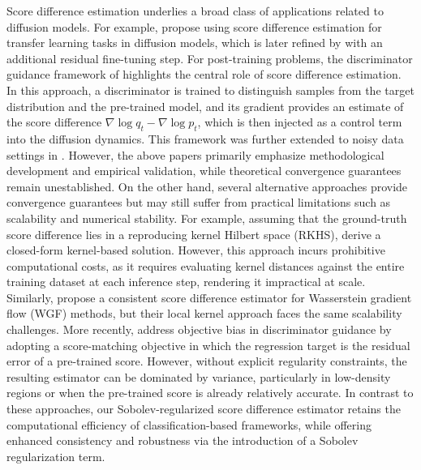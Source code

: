 \documentclass[11pt]{article}
\theoremstyle{plain}
\theoremstyle{definition}
\theoremstyle{remark}
\begin{document}
Score difference estimation underlies a broad class of applications related to diffusion models. For example, \cite{ouyang2024transfer} propose using score difference estimation for transfer learning tasks in diffusion models, which is later refined by \cite{wang2024bridging} with an additional residual fine-tuning step. For post-training problems, the discriminator guidance framework of \cite{kim2022refining} highlights the central role of score difference estimation. In this approach, a discriminator is trained to distinguish samples from the target distribution and the pre-trained model, and its gradient provides an estimate of the score difference $\nabla \log q_t - \nabla \log p_t$, which is then injected as a control term into the diffusion dynamics. This framework was further extended to noisy data settings in \cite{cong2025guiding}. However, the above papers primarily emphasize methodological development and empirical validation, while theoretical convergence guarantees remain unestablished. On the other hand, several alternative approaches provide convergence guarantees but may still suffer from practical limitations such as scalability and numerical stability.
For example, assuming that the ground-truth score difference lies in a reproducing kernel Hilbert space (RKHS), \cite{srikanthaccelerated} derive a closed-form kernel-based solution. However, this approach incurs prohibitive computational costs, as it requires evaluating kernel distances against the entire training dataset at each inference step, rendering it impractical at scale. Similarly, \cite{liu2023minimizing} propose a consistent score difference estimator for Wasserstein gradient flow (WGF) methods, but their local kernel approach faces the same scalability challenges.  More recently, \cite{verine2025improving} address objective bias in discriminator guidance by adopting a score-matching objective in which the regression target is the residual error of a pre-trained score. However, without explicit regularity constraints, the resulting estimator can be dominated by variance, particularly in low-density regions or when the pre-trained score is already relatively accurate. In contrast to these approaches, our Sobolev-regularized score difference estimator retains the computational efficiency of classification-based frameworks, while offering enhanced consistency and robustness via the introduction of a Sobolev regularization term.
\end{document}
